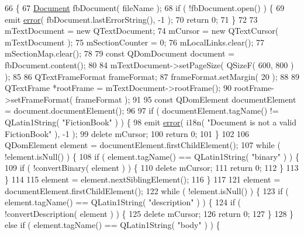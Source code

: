 \begin{DoxyCode}
66 \{
67     \hyperlink{classFictionBook_1_1Document}{Document} fbDocument( fileName );
68     \textcolor{keywordflow}{if} ( !fbDocument.open() ) \{
69         emit \hyperlink{classOkular_1_1TextDocumentConverter_a93f1335bdd8232626364c973d9d7e6b4}{error}( fbDocument.lastErrorString(), -1 );
70         \textcolor{keywordflow}{return} 0;
71     \}
72 
73     mTextDocument = \textcolor{keyword}{new} QTextDocument;
74     mCursor = \textcolor{keyword}{new} QTextCursor( mTextDocument );
75     mSectionCounter = 0;
76     mLocalLinks.clear();
77     mSectionMap.clear();
78 
79     \textcolor{keyword}{const} QDomDocument document = fbDocument.content();
80 
84     mTextDocument->setPageSize( QSizeF( 600, 800 ) );
85 
86     QTextFrameFormat frameFormat;
87     frameFormat.setMargin( 20 );
88 
89     QTextFrame *rootFrame = mTextDocument->rootFrame();
90     rootFrame->setFrameFormat( frameFormat );
91 
95     \textcolor{keyword}{const} QDomElement documentElement = document.documentElement();
96 
97     \textcolor{keywordflow}{if} ( documentElement.tagName() != QLatin1String( \textcolor{stringliteral}{"FictionBook"} ) ) \{
98         emit \hyperlink{classOkular_1_1TextDocumentConverter_a93f1335bdd8232626364c973d9d7e6b4}{error}( i18n( \textcolor{stringliteral}{"Document is not a valid FictionBook"} ), -1 );
99         \textcolor{keyword}{delete} mCursor;
100         \textcolor{keywordflow}{return} 0;
101     \}
102 
106     QDomElement element = documentElement.firstChildElement();
107     \textcolor{keywordflow}{while} ( !element.isNull() ) \{
108         \textcolor{keywordflow}{if} ( element.tagName() == QLatin1String( \textcolor{stringliteral}{"binary"} ) ) \{
109             \textcolor{keywordflow}{if} ( !convertBinary( element ) ) \{
110                 \textcolor{keyword}{delete} mCursor;
111                 \textcolor{keywordflow}{return} 0;
112             \}
113         \}
114 
115         element = element.nextSiblingElement();
116     \}
117 
121     element = documentElement.firstChildElement();
122     \textcolor{keywordflow}{while} ( !element.isNull() ) \{
123         \textcolor{keywordflow}{if} ( element.tagName() == QLatin1String( \textcolor{stringliteral}{"description"} ) ) \{
124             \textcolor{keywordflow}{if} ( !convertDescription( element ) ) \{
125                 \textcolor{keyword}{delete} mCursor;
126                 \textcolor{keywordflow}{return} 0;
127             \}
128         \} \textcolor{keywordflow}{else} \textcolor{keywordflow}{if} ( element.tagName() == QLatin1String( \textcolor{stringliteral}{"body"} ) ) \{

\end{DoxyCode}
